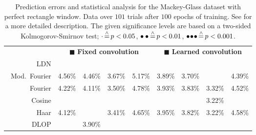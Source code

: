 \begin{table}[p]
	\newcommand{\sigA}{\ensuremath{\cdot}}
	\newcommand{\sigB}{\ensuremath{\bullet\bullet}}
	\newcommand{\sigC}{\ensuremath{\bullet\!\bullet\!\bullet}}
	\caption[Prediction errors and statistical analysis for the Mackey-Glass dataset]{Prediction errors and statistical analysis for the Mackey-Glass dataset with perfect rectangle window. Data over $101$ trials after $100$ epochs of training. See  for a more detailed description.
	The given significance levels are based on a two-sided Kolmogorov-Smirnov test; $\sigA \correspondsTo p < 0.05$, $\sigB \correspondsTo p < 0.01$, $\sigC \correspondsTo p < 0.001$.
	}
	\label{tbl:mackey_glass_results_ne}
	\centering\small\sffamily
	\setlength{\tabcolsep}{9.68pt}
	\begin{tabular}{r  r r r r  r r r r}
	\toprule
	& \multicolumn{4}{c}{{\color{skyblue1}$\blacksquare$} \textbf{Fixed convolution}}
	& \multicolumn{4}{c}{{\color{aluminium2}$\blacksquare$} \textbf{Learned convolution}} \\
	\cmidrule(r){2-5}\cmidrule(l){6-9}
	\symLTI~LDN &
	 \cellcolor{CornflowerBlue!75}{4.02\%} &
	 \cellcolor{CornflowerBlue!25}{3.88\%} &
	 \cellcolor{CornflowerBlue!25}{3.35\%} &
	 \cellcolor{CornflowerBlue!25}{4.58\%} &
	 \cellcolor{CornflowerBlue!75}{3.80\%} &
	 \cellcolor{CornflowerBlue!50}{3.64\%} &
	 \cellcolor{CornflowerBlue!75}{3.09\%} &
	 \cellcolor{CornflowerBlue!25}{4.37\%} \\
	\symLTI~Mod.~Fourier &
	4.56\% &
	4.46\% &
	3.67\% &
	5.17\% &
	3.89\% &
	3.70\% &
	 \cellcolor{CornflowerBlue!50}{3.15\%} &
	4.39\% \\
	\symSDT~Fourier &
	4.22\% &
	4.11\% &
	3.50\% &
	4.78\% &
	3.93\% &
	3.83\% &
	3.32\% &
	4.52\% \\
	\symSDT~Cosine &
	 \cellcolor{CornflowerBlue!75}{4.02\%} &
	 \cellcolor{CornflowerBlue!75}{3.73\%} &
	 \cellcolor{CornflowerBlue!75}{3.22\%} &
	 \cellcolor{CornflowerBlue!75}{4.41\%} &
	 \cellcolor{CornflowerBlue!75}{3.80\%} &
	 \cellcolor{CornflowerBlue!75}{3.59\%} &
	3.22\% &
	 \cellcolor{CornflowerBlue!50}{4.33\%} \\
	\symSDT~Haar &
	4.12\% &
	 \cellcolor{CornflowerBlue!50}{3.85\%} &
	3.41\% &
	4.65\% &
	3.95\% &
	3.82\% &
	3.22\% &
	4.58\% \\
	\symFIR~DLOP &
	 \cellcolor{CornflowerBlue!25}{4.04\%} &
	3.90\% &
	 \cellcolor{CornflowerBlue!50}{3.30\%} &
	 \cellcolor{CornflowerBlue!50}{4.46\%} &
	 \cellcolor{CornflowerBlue!25}{3.86\%} &
	 \cellcolor{CornflowerBlue!25}{3.65\%} &

\end{tabular}
\end{table}
